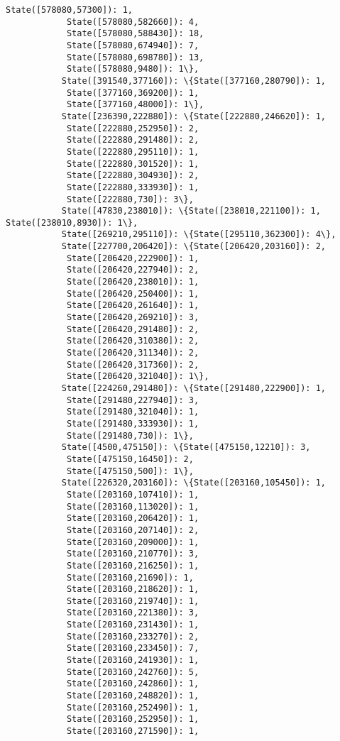 \documentclass[11pt]{article}
\begin{document}
\begin{Verbatim}[commandchars=\\\{\}]
            State([578080,57300]): 1,
            State([578080,582660]): 4,
            State([578080,588430]): 18,
            State([578080,674940]): 7,
            State([578080,698780]): 13,
            State([578080,9480]): 1\},
           State([391540,377160]): \{State([377160,280790]): 1,
            State([377160,369200]): 1,
            State([377160,48000]): 1\},
           State([236390,222880]): \{State([222880,246620]): 1,
            State([222880,252950]): 2,
            State([222880,291480]): 2,
            State([222880,295110]): 1,
            State([222880,301520]): 1,
            State([222880,304930]): 2,
            State([222880,333930]): 1,
            State([222880,730]): 3\},
           State([47830,238010]): \{State([238010,221100]): 1, State([238010,8930]): 1\},
           State([269210,295110]): \{State([295110,362300]): 4\},
           State([227700,206420]): \{State([206420,203160]): 2,
            State([206420,222900]): 1,
            State([206420,227940]): 2,
            State([206420,238010]): 1,
            State([206420,250400]): 1,
            State([206420,261640]): 1,
            State([206420,269210]): 3,
            State([206420,291480]): 2,
            State([206420,310380]): 2,
            State([206420,311340]): 2,
            State([206420,317360]): 2,
            State([206420,321040]): 1\},
           State([224260,291480]): \{State([291480,222900]): 1,
            State([291480,227940]): 3,
            State([291480,321040]): 1,
            State([291480,333930]): 1,
            State([291480,730]): 1\},
           State([4500,475150]): \{State([475150,12210]): 3,
            State([475150,16450]): 2,
            State([475150,500]): 1\},
           State([226320,203160]): \{State([203160,105450]): 1,
            State([203160,107410]): 1,
            State([203160,113020]): 1,
            State([203160,206420]): 1,
            State([203160,207140]): 2,
            State([203160,209000]): 1,
            State([203160,210770]): 3,
            State([203160,216250]): 1,
            State([203160,21690]): 1,
            State([203160,218620]): 1,
            State([203160,219740]): 1,
            State([203160,221380]): 3,
            State([203160,231430]): 1,
            State([203160,233270]): 2,
            State([203160,233450]): 7,
            State([203160,241930]): 1,
            State([203160,242760]): 5,
            State([203160,242860]): 1,
            State([203160,248820]): 1,
            State([203160,252490]): 1,
            State([203160,252950]): 1,
            State([203160,271590]): 1,

\end{Verbatim}
\end{document}
